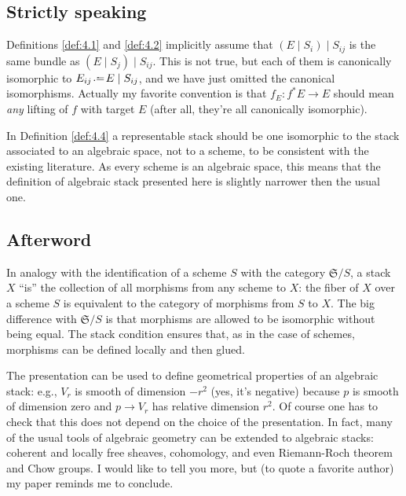 \documentclass[12pt]{memoir}
\begin{document}

\subsection{Strictly speaking}

Definitions \ref{def:4.1} and \ref{def:4.2} implicitly assume that $(E \mid S_i) \mid S_{ij}$ is the same bundle as $(E \mid S_j) \mid S_{ij}$. This is not true, but each of them is canonically isomorphic to $E_{ij} \defeq E \mid S_{ij}$, and we have just omitted the canonical isomorphisms. Actually my favorite convention is that $f_E\colon f^* E \to E$ should mean \emph{any} lifting of $f$ with target $E$ (after all, they're all canonically isomorphic).

In Definition \ref{def:4.4} a representable stack should be one isomorphic to the stack associated to an algebraic space, not to a scheme, to be consistent with the existing literature. As every scheme is an algebraic space, this means that the definition of algebraic stack presented here is slightly narrower then the usual one.

\subsection{Afterword}

In analogy with the identification of a scheme $S$ with the category $\mathfrak{S}/S$, a stack $X$ ``is'' the collection of all morphisms from any scheme to $X$: the fiber of $X$ over a scheme $S$ is equivalent to the category of morphisms from $S$ to $X$. The big difference with $\mathfrak{S}/S$ is that morphisms are allowed to be isomorphic without being equal. The stack condition ensures that, as in the case of schemes, morphisms can be defined locally and then glued.

The presentation can be used to define geometrical properties of an algebraic stack: e.g., $V_r$ is smooth of dimension $-r^2$ (yes, it's negative) because $p$ is smooth of dimension zero and $p \to V_r$ has relative dimension $r^2$. Of course one has to check that this does not depend on the choice of the presentation. In fact, many of the usual tools of algebraic geometry can be extended to algebraic stacks: coherent and locally free sheaves, cohomology, and even Riemann-Roch theorem and Chow groups. I would like to tell you more, but (to quote a favorite author) my paper reminds me to conclude.

\end{document}
